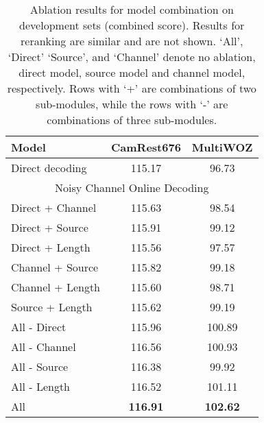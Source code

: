 \documentclass[11pt,a4paper]{article}
\begin{document}
\begin{table}[t]
    \centering
    \footnotesize
    \renewcommand{\arraystretch}{0.9}
    \begin{tabular}{lcc}
        \toprule
        \textbf{Model}   & \textbf{CamRest676} & \textbf{MultiWOZ} \\ \midrule
    Direct decoding & 115.17 & 96.73   \\ \midrule
\multicolumn{3}{c}{Noisy Channel Online Decoding} \\ \midrule
    Direct + Channel & 115.63 & 98.54\\
    Direct + Source & 115.91 & 99.12\\
    Direct + Length & 115.56 & 97.57\\
    Channel + Source & 115.82 & 99.18\\ 
    Channel + Length & 115.60 & 98.71\\
    Source + Length & 115.62 & 99.19\\
    All - Direct & 115.96 & 100.89\\
    All - Channel & 116.56 & 100.93\\
    All - Source & 116.38 & 99.92\\
    All - Length & 116.52 & 101.11\\
    All & \textbf{116.91} & \textbf{102.62}\\
    \bottomrule
    \end{tabular}
\caption{Ablation results for model combination on development sets (combined score). Results for reranking are similar and are not shown. `All', `Direct' `Source', and `Channel' denote no ablation, direct model, source model and channel model, respectively. Rows with `+' are combinations of two sub-modules, while the rows with `-' are combinations of three sub-modules. \label{tab:ablation_study}}
\end{table}
\end{document}
